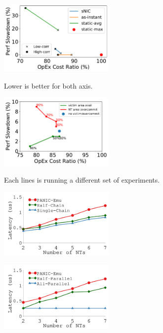 {
\begin{figure}[th]
\begin{center}
\centerline{\includegraphics[width=0.5\textwidth]{snic/Figures/fig-conslid-overview-new.pdf}}
{
Lower is better for both axis.
}
\end{center}
\end{figure}
}
{
\begin{figure}[h]
\begin{center}
\centerline{\includegraphics[width=0.5\textwidth]{snic/Figures/fig-single-snic-low-corr.pdf}}
{
Each lines is running a different set of experiments.
}
\end{center}
\end{figure}
}
{
\begin{figure}[h]
\begin{center}
\centerline{\includegraphics[width=0.5\textwidth]{snic/Figures/g_plot_nt_chain.pdf}}
{
}
\end{center}
\end{figure}
}
{
\begin{figure}[h]
\begin{center}
\centerline{\includegraphics[width=0.5\textwidth]{snic/Figures/g_plot_nt_parallel.pdf}}
{
}
\end{center}
\end{figure}
}
